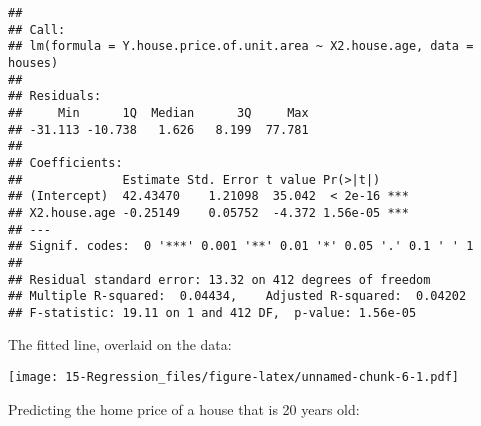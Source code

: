 \documentclass[
]{book}
\newenvironment{Shaded}{\begin{snugshade}}{\end{snugshade}}
\newcommand{\AttributeTok}[1]{\textcolor[rgb]{0.77,0.63,0.00}{#1}}
\newcommand{\ConstantTok}[1]{\textcolor[rgb]{0.00,0.00,0.00}{#1}}
\newcommand{\DecValTok}[1]{\textcolor[rgb]{0.00,0.00,0.81}{#1}}
\newcommand{\FloatTok}[1]{\textcolor[rgb]{0.00,0.00,0.81}{#1}}
\newcommand{\FunctionTok}[1]{\textcolor[rgb]{0.00,0.00,0.00}{#1}}
\newcommand{\NormalTok}[1]{#1}
\newcommand{\OtherTok}[1]{\textcolor[rgb]{0.56,0.35,0.01}{#1}}
\newcommand{\SpecialCharTok}[1]{\textcolor[rgb]{0.00,0.00,0.00}{#1}}
\newcommand{\StringTok}[1]{\textcolor[rgb]{0.31,0.60,0.02}{#1}}
\begin{document}
\begin{verbatim}
## 
## Call:
## lm(formula = Y.house.price.of.unit.area ~ X2.house.age, data = houses)
## 
## Residuals:
##     Min      1Q  Median      3Q     Max 
## -31.113 -10.738   1.626   8.199  77.781 
## 
## Coefficients:
##              Estimate Std. Error t value Pr(>|t|)    
## (Intercept)  42.43470    1.21098  35.042  < 2e-16 ***
## X2.house.age -0.25149    0.05752  -4.372 1.56e-05 ***
## ---
## Signif. codes:  0 '***' 0.001 '**' 0.01 '*' 0.05 '.' 0.1 ' ' 1
## 
## Residual standard error: 13.32 on 412 degrees of freedom
## Multiple R-squared:  0.04434,    Adjusted R-squared:  0.04202 
## F-statistic: 19.11 on 1 and 412 DF,  p-value: 1.56e-05
\end{verbatim}

The fitted line, overlaid on the data:

\begin{Shaded}
\end{Shaded}

\texttt{[image: 15-Regression\_files/figure-latex/unnamed-chunk-6-1.pdf]}

Predicting the home price of a house that is 20 years old:
\end{document}
